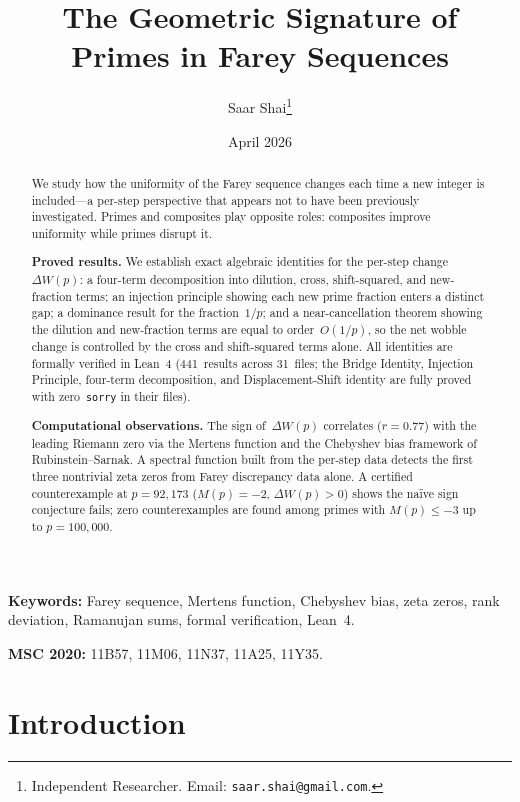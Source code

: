 \documentclass[11pt]{article}
\title{The Geometric Signature of Primes in Farey Sequences}
\author{
  Saar Shai\thanks{Independent Researcher. Email: \texttt{saar.shai@gmail.com}.}
}
\date{April 2026}
\theoremstyle{definition}
\begin{document}
\maketitle

\begin{abstract}
We study how the uniformity of the Farey sequence changes
each time a new integer is included---a per-step perspective
that appears not to have been previously investigated.
Primes and composites play opposite roles: composites
improve uniformity while primes disrupt it.

\textbf{Proved results.}
We establish exact algebraic identities for the per-step
change~$\Delta W(p)$: a four-term decomposition into dilution,
cross, shift-squared, and new-fraction terms; an injection
principle showing each new prime fraction enters a distinct
gap; a dominance result for the fraction~$1/p$; and a
near-cancellation theorem showing the dilution and new-fraction
terms are equal to order~$O(1/p)$, so the net wobble change
is controlled by the cross and shift-squared terms alone.
All identities are formally verified in Lean~4
(441~results across 31~files; the Bridge Identity,
Injection Principle, four-term decomposition, and
Displacement-Shift identity are fully proved with
zero~\texttt{sorry} in their files).

\textbf{Computational observations.}
The sign of~$\Delta W(p)$ correlates ($r = 0.77$) with the
leading Riemann zero via the Mertens function and the
Chebyshev bias framework of Rubinstein--Sarnak.
A spectral function built from the per-step data detects
the first three nontrivial zeta zeros from Farey discrepancy
data alone.  A certified counterexample at $p = 92{,}173$
($M(p) = -2$, $\Delta W(p) > 0$) shows the na\"ive sign
conjecture fails; zero counterexamples are found among primes
with $M(p) \le -3$ up to $p = 100{,}000$.
\end{abstract}

\medskip
\noindent\textbf{Keywords:} Farey sequence, Mertens function, Chebyshev bias,
zeta zeros, rank deviation, Ramanujan sums, formal verification, Lean~4.

\noindent\textbf{MSC 2020:} 11B57, 11M06, 11N37, 11A25, 11Y35.

\section{Introduction}\label{sec:intro}
\end{document}

